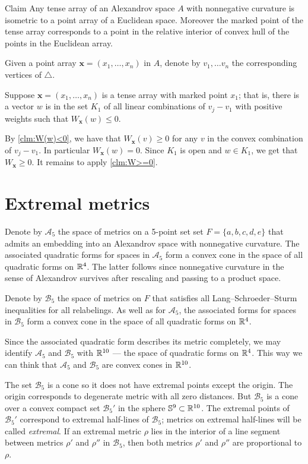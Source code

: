 \documentclass{article}
\begin{document}
\begin{thm}{Claim}\label{clm:W(w)==0}
Any tense array of an Alexandrov space $A$ with nonnegative curvature is isometric to a point array of a Euclidean space.
Moreover the marked point of the tense array corresponds to a point in the relative interior of convex hull of the points in the Euclidean array.
\end{thm}

Given a point array $\bm{x}=(x_1,\dots,x_n)$ in $A$, denote by $v_1,\dots v_n$ the corresponding vertices of $\triangle$.

Suppose $\bm{x}=(x_1,\dots,x_n)$ is a tense array with marked point $x_1$;
that is, there is a vector $w$ is in the set $K_1$ of all linear combinations of $v_j-v_1$ with positive weights such that $W_{\bm{x}}(w)\le 0$. 

By \ref{clm:W(w)<0}, we have that $W_{\bm{x}}(v)\ge 0$ for any $v$ in the convex combination of $v_j-v_1$.
In particular $W_{\bm{x}}(w)=0$.
Since $K_1$ is open and $w\in K_1$, we get that $W_{\bm{x}}\ge 0$.
It remains to apply \ref{clm:W>=0}.
\qeds

\section{Extremal metrics}\label{sec:ext}

Denote by $\mathcal{A}_5$ the space of metrics on a 5-point set set $F=\{a,b,c,d,e\}$ that admits an embedding into an Alexandrov space with nonnegative curvature.
The associated quadratic forms for spaces in $\mathcal{A}_5$ form a convex cone in the space of all quadratic forms on $\mathbb{R}^4$.
The latter follows since nonnegative curvature in the sense of Alexandrov survives after rescaling and passing to a product space.

Denote by $\mathcal{B}_5$ the space of metrics on $F$ that satisfies all Lang--Schroeder--Sturm inequalities for all relabelings.
As well as for $\mathcal{A}_5$, the associated forms for spaces in $\mathcal{B}_5$ form a convex cone in the space of all quadratic forms on $\mathbb{R}^4$.

Since the associated quadratic form describes its metric completely, we may identify $\mathcal{A}_5$ and $\mathcal{B}_5$ with $\mathbb{R}^{10}$ --- the space of quadratic forms on $\mathbb{R}^4$.
This way we can think that $\mathcal{A}_5$ and $\mathcal{B}_5$ are convex cones in $\mathbb{R}^{10}$.

The set $\mathcal{B}_5$ is a cone so it does not have extremal points except the origin.
The origin corresponds to degenerate metric with all zero distances.
But $\mathcal{B}_5$ is a cone over a convex compact set $\mathcal{B}_5'$ in the sphere $\mathbb{S}^9\subset \mathbb{R}^{10}$.
The extremal points of $\mathcal{B}_5'$ correspond to extremal half-lines of $\mathcal{B}_5$;
metrics on extremal half-lines will be called \emph{extremal}.
If an extremal metric $\rho$ lies in the interior of a line segment between metrics $\rho'$ and $\rho''$ in $\mathcal{B}_5$, then both metrics $\rho'$ and $\rho''$ are proportional to $\rho$.
\end{document}
